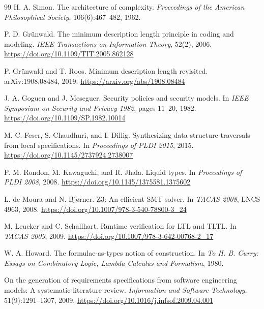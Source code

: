 \begin{thebibliography}{99}
H. A. Simon.
\newblock The architecture of complexity.
\newblock \emph{Proceedings of the American Philosophical Society}, 106(6):467--482,
1962.

P. D. Gr\"unwald.
\newblock The minimum description length principle in coding and modeling.
\newblock \emph{IEEE Transactions on Information Theory}, 52(2), 2006.
\newblock \url{https://doi.org/10.1109/TIT.2005.862128}

P. Gr\"unwald and T. Roos.
\newblock Minimum description length revisited.
\newblock arXiv:1908.08484, 2019.
\newblock \url{https://arxiv.org/abs/1908.08484}

J. A. Goguen and J. Meseguer.
\newblock Security policies and security models.
\newblock In \emph{IEEE Symposium on Security and Privacy 1982}, pages 11--20, 1982.
\newblock \url{https://doi.org/10.1109/SP.1982.10014}

M. C. Feser, S. Chaudhuri, and I. Dillig.
\newblock Synthesizing data structure traversals from local specifications.
\newblock In \emph{Proceedings of PLDI 2015}, 2015.
\newblock \url{https://doi.org/10.1145/2737924.2738007}

P. M. Rondon, M. Kawaguchi, and R. Jhala.
\newblock Liquid types.
\newblock In \emph{Proceedings of PLDI 2008}, 2008.
\newblock \url{https://doi.org/10.1145/1375581.1375602}

L. de Moura and N. Bj{\o}rner.
\newblock Z3: An efficient SMT solver.
\newblock In \emph{TACAS 2008}, LNCS 4963, 2008.
\newblock \url{https://doi.org/10.1007/978-3-540-78800-3_24}

M. Leucker and C. Schallhart.
\newblock Runtime verification for LTL and TLTL.
\newblock In \emph{TACAS 2009}, 2009.
\newblock \url{https://doi.org/10.1007/978-3-642-00768-2_17}

W. A. Howard.
\newblock The formulae-as-types notion of construction.
\newblock In \emph{To H. B. Curry: Essays on Combinatory Logic, Lambda Calculus and
Formalism}, 1980.

On the generation of requirements specifications from software engineering models:
A systematic literature review.
\newblock \emph{Information and Software Technology}, 51(9):1291--1307, 2009.
\newblock \url{https://doi.org/10.1016/j.infsof.2009.04.001}



\end{thebibliography}
